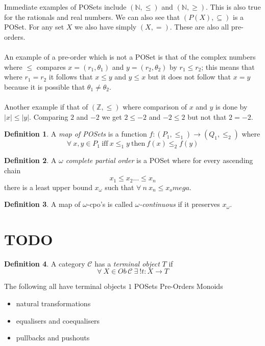\documentclass{article}
\theoremstyle{definition}
\newtheorem{definition}{Definition}[section]
\begin{document}
Immediate examples of POSets include $(\mathbb{N},\leq)$ and $(\mathbb{N},\geq)$.
This is also true for the rationals and real numbers.
We can also see that $(P(X), \subseteq)$ is a POSet.
For any set $X$ we also have simply $(X,=)$.
These are also all pre-orders.
\\ \\
An example of a pre-order which is not a POSet is that of the complex numbers
where $\leq$ compares $x = (r_1,\theta_1)$ and $y = (r_2,\theta_2)$ by $r_1 \leq r_2$;
this means that where $r_1 = r_2$ it follows that $x \leq y$ and $y \leq x$
but it does not follow that $x = y$ because it is possible that $\theta_1 \neq \theta_2$.
\\ \\
Another example if that of $(\mathbb{Z},\leq)$ where comparison of $x$ and $y$ is done by
$|x| \leq |y|$.
Comparing $2$ and $-2$ we get $2 \leq -2$ and $-2 \leq 2$ but not that $2 = -2$.

\begin{definition}
	A \textit{map of POSets} is a function $f : (P_1,\leq_1) \rightarrow (Q_1,\leq_2)$ where
	$$\forall\ x,y \in P_1\ \textrm{iff}\ x \leq_1 y\ \textrm{then}\ f(x) \leq_2 f(y)$$
\end{definition}

\begin{definition}
	A \textit{$\omega$ complete partial order} is a POSet where for every ascending chain
	$$x_1 \leq x_2 \dots \leq x_n$$
	there is a least upper bound $x_\omega$ such that $\forall\ n\ x_n \leq x_omega$.
\end{definition}

\begin{definition}
	A map of $\omega$-cpo's is called \textit{$\omega$-continuous}
	if it preserves $x_\omega$.
\end{definition}

\section{TODO}

\begin{definition}
	A category $\mathcal{C}$ has a \textit{terminal object} $T$ if
	$$\forall\ X \in Ob\,\mathcal{C}\ \exists\ !t : X \rightarrow T$$
\end{definition}

The following all have terminal objects $1$
POSets
Pre-Orders
Monoids

\begin{itemize}
\item natural transformations
\item equalisers and coequalisers
\item pullbacks and pushouts
\end{itemize}
\end{document}

